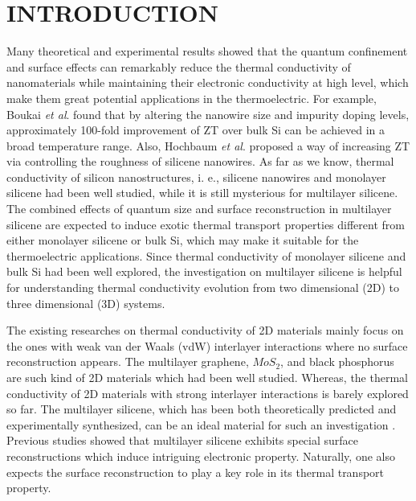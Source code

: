 \documentclass[aps,prb,twocolumn,showpacs,amsmath,amssymb]{revtex4-1}
\begin{document}
\section{INTRODUCTION}

Many theoretical and experimental results showed that the quantum confinement and surface effects can remarkably reduce the thermal conductivity of nanomaterials while maintaining their electronic conductivity at high level, which make them great potential applications in the thermoelectric\cite{Dresselhaus2007,Chen2013}. For example,  Boukai \emph{et al}.\cite{Boukai2008} found that by altering the nanowire size and impurity doping levels,  approximately 100-fold improvement of  ZT over bulk Si can be achieved in a broad temperature range. Also, Hochbaum \emph{et al}.\cite{Hochbaum2008}  proposed a way of increasing ZT via controlling the roughness of silicene nanowires. As far as we know,  thermal conductivity of silicon nanostructures, i. e.,  silicene nanowires\cite{Hochbaum2008,Yang2010,Shi2009,Boukai2008} and monolayer silicene\cite{Pei2013,Ng2013,Xie2014,Zhang2014,Liu2014,Wang2015,Zhang2015a,Chen2016} had been well studied, while it is still mysterious for multilayer silicene.
The combined effects of quantum size and surface reconstruction in multilayer silicene are expected to induce exotic thermal transport properties different from either monolayer silicene or bulk Si, which may make it suitable for the thermoelectric applications. Since thermal conductivity of monolayer silicene and bulk Si had been well explored, the investigation on multilayer silicene is helpful for understanding thermal conductivity evolution from two dimensional (2D) to three dimensional (3D) systems.

The existing researches on thermal conductivity of 2D materials mainly focus on the ones with weak van der Waals (vdW) interlayer interactions where no surface reconstruction appears. The multilayer graphene\cite{Lindsay2011, Ni2012,Wang2011}, $MoS_2$\cite{Liu2015}, and black phosphorus\cite{Zhang2015,Peng2015,Jain2015} are such kind of 2D materials which had been well studied.  Whereas, the thermal conductivity of 2D materials with strong interlayer interactions is barely explored so far.
The multilayer silicene, which has been both theoretically predicted and experimentally synthesized, can be an ideal material for such an investigation \cite{Fu2014,Padova2016,Guo2015Structural}.
Previous studies showed that multilayer silicene exhibits special surface reconstructions which induce  intriguing electronic property\cite{Fu2014,Guo2015Structural}. Naturally, one also expects the surface reconstruction to play a key role in its thermal transport property.
\end{document}
